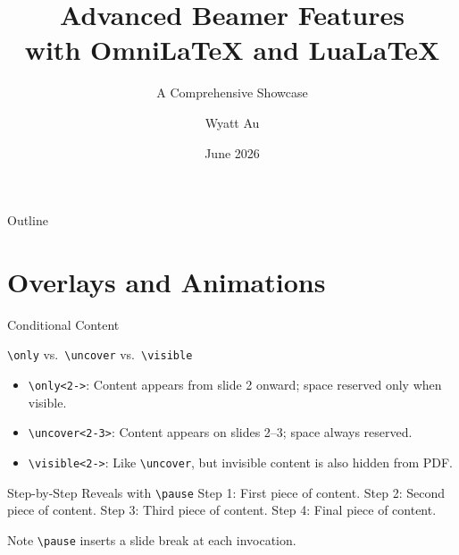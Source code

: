 \documentclass[
  doctype=beamer,
  beameraspectratio=169,
  beamertheme=Madrid,
  institution=generic,
]{omnilatex}
\title[Advanced Beamer Features]{Advanced Beamer Features\\
with OmniLaTeX and LuaLaTeX}
\subtitle{A Comprehensive Showcase}
\author[Wyatt Au]{Wyatt Au}
\institute[OmniLaTeX Project]{OmniLaTeX Project\\\texttt{https://github.com/WyattAu/OmniLaTeX-template}}
\date{June 2026}
\begin{document}

\begin{frame}[plain]
  \titlepage
\end{frame}


\begin{frame}{Outline}
  \tableofcontents[hideallsubsections]
\end{frame}

\section{Overlays and Animations}

\begin{frame}{Conditional Content}
  \begin{block}{\texttt{\textbackslash only} vs.\ \texttt{\textbackslash uncover} vs.\ \texttt{\textbackslash visible}}
    \begin{itemize}
      \item \texttt{\textbackslash only<2->{}}: Content appears from slide 2 onward; space reserved only when visible.
      \item \texttt{\textbackslash uncover<2-3>{}}: Content appears on slides 2--3; space always reserved.
      \item \texttt{\textbackslash visible<2->{}}: Like \texttt{\textbackslash uncover}, but invisible content is also hidden from PDF.
    \end{itemize}
  \end{block}


\end{frame}

\begin{frame}{Step-by-Step Reveals with \texttt{\textbackslash pause}}
  Step 1: First piece of content.\pause
  Step 2: Second piece of content.\pause
  Step 3: Third piece of content.\pause
  Step 4: Final piece of content.

  \vspace{1em}
  \begin{block}{Note}
    \texttt{\textbackslash pause} inserts a slide break at each invocation.
  \end{block}
\end{frame}
\end{document}
